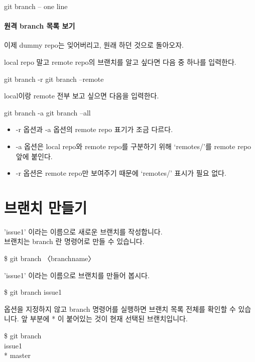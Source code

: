 \documentclass[12pt, a4paper, oneside]{book}
\let\stdsection\section
\renewcommand\section{\newpage\stdsection}
\begin{document}
		\begin{tcolorbox}
 		git branch  -- one line
		\end{tcolorbox}


\paragraph{원격 branch 목록 보기}
이제 dummy repo는 잊어버리고, 원래 하던 것으로 돌아오자.

local repo 말고 remote repo의 브랜치를 알고 싶다면 다음 중 하나를 입력한다.

		\begin{tcolorbox}
		git branch -r
		git branch –remote
		\end{tcolorbox}

local이랑 remote 전부 보고 싶으면 다음을 입력한다.

		\begin{tcolorbox}
		git branch -a
		git branch –all
		\end{tcolorbox}

		\begin{itemize}	[							leftmargin=6em]
		\item 	-r 옵션과 -a 옵션의 remote repo 표기가 조금 다르다.
		\item -a 옵션은 local repo와 remote repo를 구분하기 위해 ‘remotes/’를 remote repo 앞에 붙인다.
		\item -r 옵션은 remote repo만 보여주기 때문에 ‘remotes/’ 표시가 필요 없다.
		\end{itemize}

	\section{브랜치 만들기 }

		'issue1' 이라는 이름으로 새로운 브랜치를 작성합니다.\\
		브랜치는 branch 란 명령어로 만들 수 있습니다.

		\begin{tcolorbox}
		\$ git branch 〈branchname〉
		\end{tcolorbox}


'issue1' 이라는 이름으로 브랜치를 만들어 봅시다.

		\begin{tcolorbox}
		\$ git branch issue1
		\end{tcolorbox}

옵션을 지정하지 않고 branch 명령어를 실행하면 브랜치 목록 전체를 확인할 수 있습니다. 앞 부분에 * 이 붙어있는 것이 현재 선택된 브랜치입니다.
		\begin{tcolorbox}
		\$ git branch  \\
		  issue1  \\
		* master  
		\end{tcolorbox}
\end{document}
